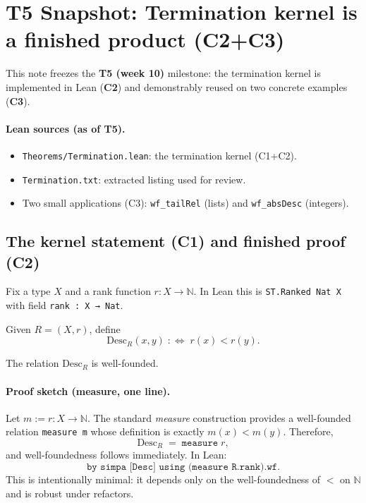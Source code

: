 \section{T5 Snapshot: Termination kernel is a finished product (C2+C3)}
\label{sec:t5-termination}

This note freezes the \textbf{T5 (week 10)} milestone: the termination kernel is implemented in Lean
(\textbf{C2}) and demonstrably reused on two concrete examples (\textbf{C3}).

\paragraph{Lean sources (as of T5).}
\begin{itemize}
\item \texttt{Theorems/Termination.lean}: the termination kernel (C1+C2).
\item \texttt{Termination.txt}: extracted listing used for review.
\item Two small applications (C3): \texttt{wf\_tailRel} (lists) and \texttt{wf\_absDesc} (integers).
\end{itemize}

\subsection{The kernel statement (C1) and finished proof (C2)}
Fix a type $X$ and a rank function $r : X \to \mathbb{N}$.
In Lean this is \texttt{ST.Ranked Nat X} with field \texttt{rank : X → Nat}.

\begin{definition}
Given $R=(X,r)$, define
\[
  \mathrm{Desc}_R(x,y) \;:\!\!\iff\; r(x) < r(y).
\]
\end{definition}

\begin{theorem}
\label{thm:t5-wf-desc}
The relation $\mathrm{Desc}_R$ is well-founded.
\end{theorem}

\paragraph{Proof sketch (measure, one line).}
Let $m := r : X \to \mathbb{N}$. The standard \emph{measure} construction provides a well-founded
relation \texttt{measure m} whose definition is exactly $m(x) < m(y)$.
Therefore,
\[
  \mathrm{Desc}_R \;=\; \texttt{measure}\;r,
\]
and well-foundedness follows immediately. In Lean:
\[
  \texttt{by simpa [Desc] using (measure R.rank).wf}.
\]
This is intentionally minimal: it depends only on the well-foundedness of $<$ on $\mathbb{N}$ and is
robust under refactors.

